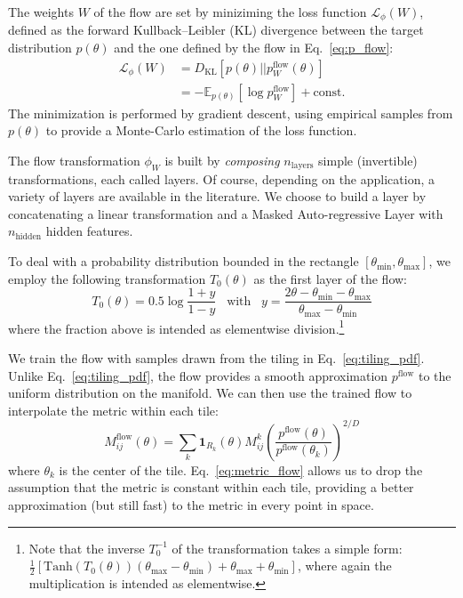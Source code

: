 \documentclass[twocolumn,showpacs,preprintnumbers,nofootinbib,prd,
superscriptaddress,10pt]{revtex4-2}
\begin{document}
The weights $W$ of the flow are set by miniziming the loss function $\mathcal{L}_\phi(W)$, defined as the forward Kullback–Leibler (KL) divergence between the target distribution $p(\theta)$ and the one defined by the flow in Eq.~\eqref{eq:p_flow}:
\begin{align}
	\mathcal{L}_\phi(W) 	&= D_{\text{KL}}[p(\theta) || p^\text{flow}_W(\theta)] \nonumber \\
					&= - \mathbb{E}_{p(\theta)} [\log p^\text{flow}_W] + \text{const.}
\end{align}
The minimization is performed by gradient descent, using empirical samples from $p(\theta)$ to provide a Monte-Carlo estimation of the loss function.

The flow transformation $\phi_W$ is built by {\it composing} $n_\text{layers}$ simple (invertible) transformations, each called layers. Of course, depending on the application, a variety of layers are available in the literature. We choose to build a layer by concatenating a linear transformation and a Masked Auto-regressive Layer \cite{MADE, MAF,MAF_bis} with $n_\text{hidden}$ hidden features.

To deal with a probability distribution bounded in the rectangle $[\theta_\text{min}, \theta_\text{max}]$, we employ the following transformation $T_0(\theta)$ as the first layer of the flow:
\begin{equation}
	T_0(\theta) = 0.5 \log \frac{1 + y}{1 - y} \;\;\; \text{with} \;\;\; y = \frac{2\theta - \theta_\text{min} - \theta_\text{max}}{\theta_\text{max}- \theta_\text{min}}
\end{equation}
where the fraction above is intended as elementwise division.\footnote{
Note that the inverse $T_0^{-1}$ of the transformation takes a simple form: $\frac{1}{2} [\text{Tanh}(T_0(\theta))(\theta_\text{max} - \theta_\text{min})+\theta_\text{max}+ \theta_\text{min}]$, where again the multiplication is intended as elementwise.
}

We train the flow with samples drawn from the tiling in Eq.~\eqref{eq:tiling_pdf}.
Unlike Eq.~\eqref{eq:tiling_pdf}, the flow provides a smooth approximation  $p^\text{flow}$ to the uniform distribution on the manifold.
We can then use the trained flow to interpolate the metric within each tile:
\begin{equation}\label{eq:metric_flow}
	M^{\text{flow}}_{ij}(\theta) = \sum_{k} \mathbf{1}_{R_k}(\theta) M^{k}_{ij} \left( \frac{p^{\text{flow}}(\theta)}{p^{\text{flow}}(\theta_k)}\right)^{2/D}
\end{equation}
where $\theta_k$ is the center of the tile.
Eq.~\eqref{eq:metric_flow} allows us to drop the assumption that the metric is constant within each tile, providing a better approximation (but still fast) to the metric in every point in space.
\end{document}
